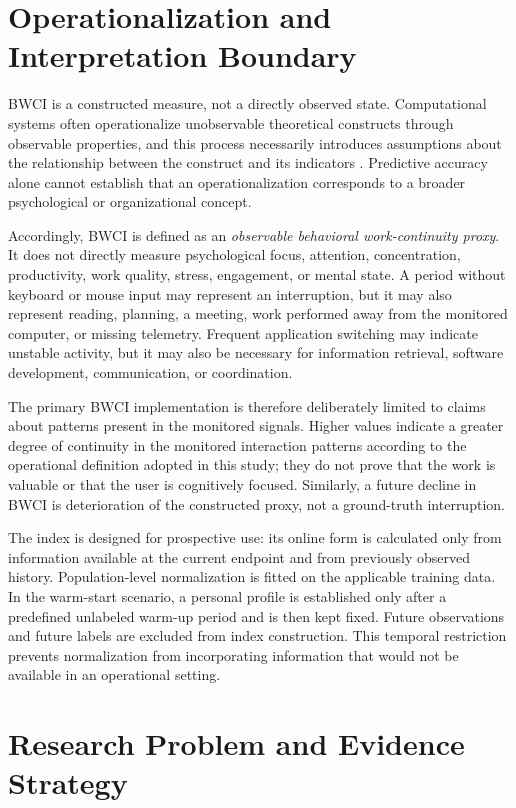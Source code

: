 \section{Operationalization and Interpretation Boundary}
BWCI is a constructed measure, not a directly observed state. Computational systems often operationalize unobservable theoretical constructs through observable properties, and this process necessarily introduces assumptions about the relationship between the construct and its indicators \parencite{jacobs2021measurement}. Predictive accuracy alone cannot establish that an operationalization corresponds to a broader psychological or organizational concept. 

Accordingly, BWCI is defined as an \emph{observable behavioral work-continuity proxy}. It does not directly measure psychological focus, attention, concentration, productivity, work quality, stress, engagement, or mental state. A period without keyboard or mouse input may represent an interruption, but it may also represent reading, planning, a meeting, work performed away from the monitored computer, or missing telemetry. Frequent application switching may indicate unstable activity, but it may also be necessary for information retrieval, software development, communication, or coordination.

The primary BWCI implementation is therefore deliberately limited to claims about patterns present in the monitored signals. Higher values indicate a greater degree of continuity in the monitored interaction patterns according to the operational definition adopted in this study; they do not prove that the work is valuable or that the user is cognitively focused. Similarly, a future decline in BWCI is deterioration of the constructed proxy, not a ground-truth interruption.

The index is designed for prospective use: its online form is calculated only from information available at the current endpoint and from previously observed history. Population-level normalization is fitted on the applicable training data. In the warm-start scenario, a personal profile is established only after a predefined unlabeled warm-up period and is then kept fixed. Future observations and future labels are excluded from index construction. This temporal restriction prevents normalization from incorporating information that would not be available in an operational setting.

\section{Research Problem and Evidence Strategy}


